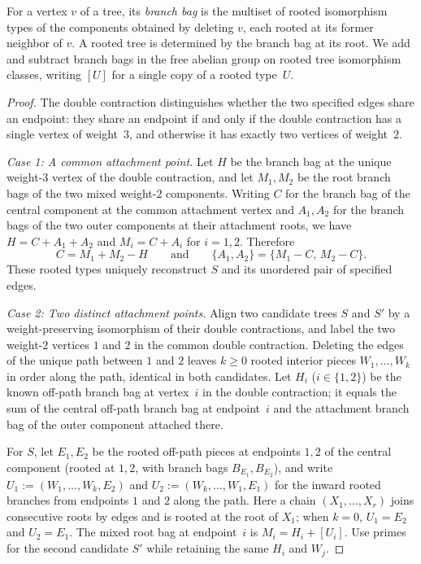 \documentclass[10pt]{article}
\begin{document}
For a vertex $v$ of a tree, its \emph{branch bag} is the multiset of rooted isomorphism types of the components obtained by deleting $v$, each rooted at its former neighbor of $v$. A rooted tree is determined by the branch bag at its root. We add and subtract branch bags in the free abelian group on rooted tree isomorphism classes, writing $[U]$ for a single copy of a rooted type~$U$.

\begin{proof}
The double contraction distinguishes whether the two specified edges share an endpoint: they share an endpoint if and only if the double contraction has a single vertex of weight~$3$, and otherwise it has exactly two vertices of weight~$2$.

\medskip
\noindent\emph{Case 1: A common attachment point.}
Let $H$ be the branch bag at the unique weight-$3$ vertex of the double contraction, and let $M_1,M_2$ be the root branch bags of the two mixed weight-$2$ components. Writing $C$ for the branch bag of the central component at the common attachment vertex and $A_1,A_2$ for the branch bags of the two outer components at their attachment roots, we have $H = C+A_1+A_2$ and $M_i = C+A_i$ for $i=1,2$. Therefore
\[
C = M_1 + M_2 - H \qquad\text{and}\qquad \{A_1,A_2\} = \{M_1-C,\, M_2-C\}.
\]
These rooted types uniquely reconstruct $S$ and its unordered pair of specified edges.

\medskip
\noindent\emph{Case 2: Two distinct attachment points.}
Align two candidate trees $S$ and $S'$ by a weight-preserving isomorphism of their double contractions, and label the two weight-$2$ vertices $1$ and $2$ in the common double contraction. Deleting the edges of the unique path between $1$ and $2$ leaves $k\ge 0$ rooted interior pieces $W_1,\ldots,W_k$ in order along the path, identical in both candidates. Let $H_i$ ($i\in\{1,2\}$) be the known off-path branch bag at vertex~$i$ in the double contraction; it equals the sum of the central off-path branch bag at endpoint~$i$ and the attachment branch bag of the outer component attached there.

For $S$, let $E_1,E_2$ be the rooted off-path pieces at endpoints $1,2$ of the central component (rooted at $1,2$, with branch bags $B_{E_1},B_{E_2}$), and write $U_1 := (W_1,\ldots,W_k,E_2)$ and $U_2 := (W_k,\ldots,W_1,E_1)$ for the inward rooted branches from endpoints $1$ and $2$ along the path. Here a chain $(X_1,\ldots,X_r)$ joins consecutive roots by edges and is rooted at the root of $X_1$; when $k=0$, $U_1=E_2$ and $U_2=E_1$. The mixed root bag at endpoint~$i$ is $M_i = H_i + [U_i]$. Use primes for the second candidate $S'$ while retaining the same $H_i$ and $W_j$.


\end{proof}
\end{document}
